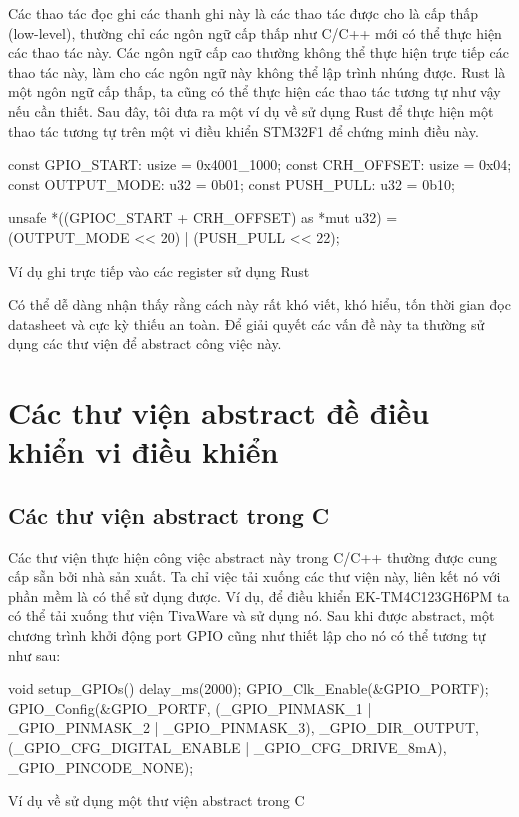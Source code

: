 Các thao tác đọc ghi các thanh ghi này là các thao tác được cho là cấp thấp (low-level), thường chỉ các ngôn ngữ cấp thấp như C/C++ mới có thể thực hiện các thao tác này.
Các ngôn ngữ cấp cao thường không thể thực hiện trực tiếp các thao tác này, làm cho các ngôn ngữ này không thể lập trình nhúng được.
Rust là một ngôn ngữ cấp thấp,  ta cũng có thể thực hiện các thao tác tương tự như vậy nếu cần thiết.
Sau đây, tôi đưa ra một ví dụ về sử dụng Rust để thực hiện một thao tác tương tự trên một vi điều khiển STM32F1 để chứng minh điều này.
\begin{listing}[ht]
\begin{rustcode}
const GPIO_START: usize = 0x4001_1000;
const CRH_OFFSET: usize = 0x04;
const OUTPUT_MODE: u32 = 0b01;
const PUSH_PULL: u32 = 0b10;

unsafe {
    *((GPIOC_START + CRH_OFFSET) as *mut u32) = (OUTPUT_MODE << 20) | (PUSH_PULL << 22);
}
\end{rustcode}
\caption{Ví dụ ghi trực tiếp vào các register sử dụng Rust}
\end{listing}

Có thể dễ dàng nhận thấy rằng cách này rất khó viết, khó hiểu, tốn thời gian đọc datasheet và cực kỳ thiếu an toàn.
Để giải quyết các vấn đề này ta thường sử dụng các thư viện để abstract công việc này.
\section{Các thư viện abstract đề điều khiển vi điều khiển}
\subsection{Các thư viện abstract trong C}
Các thư viện thực hiện công việc abstract này trong C/C++ thường được cung cấp sẵn bởi nhà sản xuất.
Ta chỉ việc tải xuống các thư viện này, liên kết nó với phần mềm là có thể sử dụng được.
Ví dụ, để điều khiển EK-TM4C123GH6PM ta có thể tải xuống thư viện TivaWare \cite{tivac_tivaware} và sử dụng nó.
Sau khi được abstract, một chương trình khởi động port GPIO cũng như thiết lập cho nó có thể tương tự như sau:
\begin{listing}[ht]
\begin{ccode}
void setup_GPIOs()
{
     delay_ms(2000);
     GPIO_Clk_Enable(&GPIO_PORTF);
     GPIO_Config(&GPIO_PORTF,
                 (_GPIO_PINMASK_1 | _GPIO_PINMASK_2 | _GPIO_PINMASK_3),
                 _GPIO_DIR_OUTPUT,
                 (_GPIO_CFG_DIGITAL_ENABLE | _GPIO_CFG_DRIVE_8mA),
                 _GPIO_PINCODE_NONE);
}
\end{ccode}
\caption{Ví dụ về sử dụng một thư viện abstract trong C}
\end{listing}

